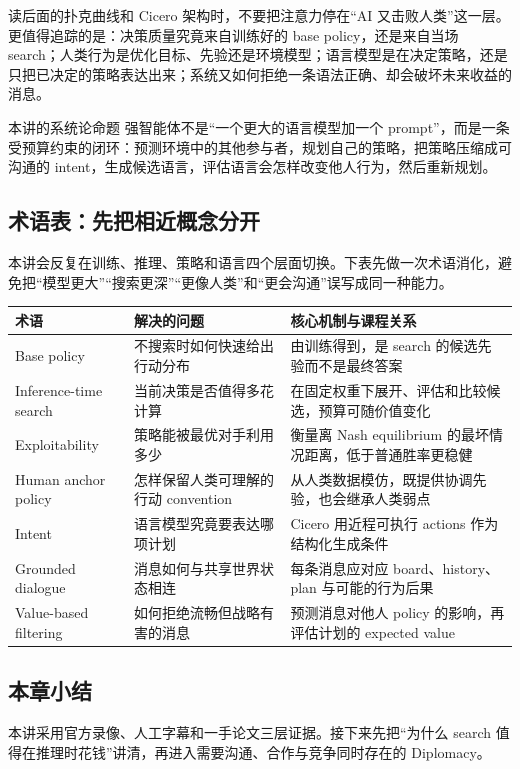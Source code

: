 读后面的扑克曲线和 Cicero 架构时，不要把注意力停在“AI 又击败人类”这一层。更值得追踪的是：决策质量究竟来自训练好的 base policy，还是来自当场 search；人类行为是优化目标、先验还是环境模型；语言模型是在决定策略，还是只把已决定的策略表达出来；系统又如何拒绝一条语法正确、却会破坏未来收益的消息。

\begin{importantbox}{本讲的系统论命题}
强智能体不是“一个更大的语言模型加一个 prompt”，而是一条受预算约束的闭环：预测环境中的其他参与者，规划自己的策略，把策略压缩成可沟通的 intent，生成候选语言，评估语言会怎样改变他人行为，然后重新规划。
\end{importantbox}

\subsection{术语表：先把相近概念分开}

本讲会反复在训练、推理、策略和语言四个层面切换。下表先做一次术语消化，避免把“模型更大”“搜索更深”“更像人类”和“更会沟通”误写成同一种能力。

\begin{longtable}{L{0.23\textwidth}L{0.30\textwidth}L{0.37\textwidth}}
\toprule
术语 & 解决的问题 & 核心机制与课程关系 \\
\midrule
Base policy & 不搜索时如何快速给出行动分布 & 由训练得到，是 search 的候选先验而不是最终答案 \\
Inference-time search & 当前决策是否值得多花计算 & 在固定权重下展开、评估和比较候选，预算可随价值变化 \\
Exploitability & 策略能被最优对手利用多少 & 衡量离 Nash equilibrium 的最坏情况距离，低于普通胜率更稳健 \\
Human anchor policy & 怎样保留人类可理解的行动 convention & 从人类数据模仿，既提供协调先验，也会继承人类弱点 \\
Intent & 语言模型究竟要表达哪项计划 & Cicero 用近程可执行 actions 作为结构化生成条件 \\
Grounded dialogue & 消息如何与共享世界状态相连 & 每条消息应对应 board、history、plan 与可能的行为后果 \\
Value-based filtering & 如何拒绝流畅但战略有害的消息 & 预测消息对他人 policy 的影响，再评估计划的 expected value \\
\bottomrule
\end{longtable}

\subsection{本章小结}

本讲采用官方录像、人工字幕和一手论文三层证据。接下来先把“为什么 search 值得在推理时花钱”讲清，再进入需要沟通、合作与竞争同时存在的 Diplomacy。

